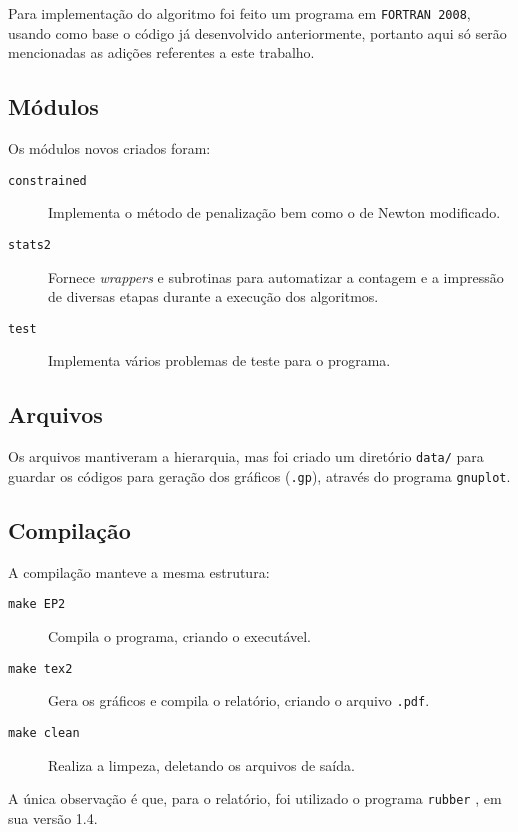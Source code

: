 Para implementação do algoritmo foi feito um programa em \texttt{FORTRAN 2008},
usando como base o código já desenvolvido anteriormente, portanto aqui só serão
mencionadas as adições referentes a este trabalho.

\subsection{Módulos}
    Os módulos novos criados foram:

    \begin{description}
        \item[\texttt{constrained}] Implementa o método de penalização bem como o de Newton modificado.
        \item[\texttt{stats2}] Fornece \emph{wrappers} e subrotinas para automatizar a contagem e a impressão de diversas etapas durante a execução dos algoritmos.
        \item[\texttt{test}]  Implementa vários problemas de teste para o programa.
    \end{description}

\subsection{Arquivos}
    Os arquivos mantiveram a hierarquia, mas foi criado um diretório \texttt{data/}
    para guardar os códigos para geração dos gráficos (\texttt{.gp}), através do programa \texttt{gnuplot}.

\subsection{Compilação}
    A compilação manteve a mesma estrutura:
    \begin{description}
        \item[\texttt{make EP2}] Compila o programa, criando o executável.
        \item[\texttt{make tex2}] Gera os gráficos e compila o relatório, criando o arquivo \texttt{.pdf}.
        \item[\texttt{make clean}] Realiza a limpeza, deletando os arquivos de saída.
    \end{description}

    A única observação é que, para o relatório, foi utilizado o programa \texttt{rubber} \citep{web:rubber},
    em sua versão 1.4.
